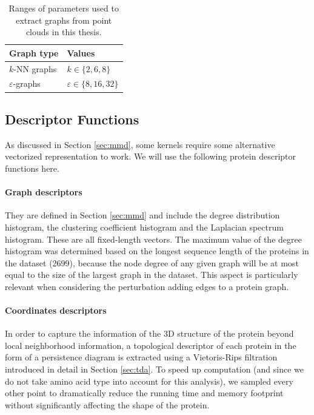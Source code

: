 \begin{table}
  \centering
  \begin{tabular}{ll}
    \toprule
    \textbf{Graph type} & \textbf{Values} \\
    \midrule
    $k$-NN graphs & $k\in \{2, 6, 8\}$ \\
    $\varepsilon$-graphs & $\varepsilon\in\{8, 16, 32\}$ \\
    \bottomrule
  \end{tabular}
  \caption{Ranges of parameters used to extract graphs from point clouds in this thesis.}
  \label{tab:graph_extraction}
\end{table}


\subsection{Descriptor Functions}\label{sec:descriptors}

As discussed in Section \ref{sec:mmd}, some kernels require some alternative vectorized
representation to work. We will use the following protein descriptor functions
here.


\paragraph{Graph descriptors} They are defined in Section \ref{sec:mmd} and include
  the degree distribution histogram, the clustering coefficient histogram and
  the Laplacian spectrum histogram. These are all fixed-length vectors. The
  maximum value of the degree histogram was determined based on the longest
  sequence length of the proteins in the dataset (2699), because the node degree
  of any given graph will be at most equal to the size of the largest graph in
  the dataset. This aspect is particularly relevant when considering the
  perturbation adding edges to a protein graph.

\paragraph{Coordinates descriptors} In order to capture the information of the
3D structure of the protein beyond local neighborhood information, a topological
descriptor of each protein in the form of a persistence diagram is extracted
using a Vietoris-Rips filtration introduced in detail in Section \ref{sec:tda}.
To speed up computation (and since we do not take amino acid type into account
for this analysis), we sampled every other point to dramatically reduce the
running time and memory footprint without significantly affecting the shape of
the protein.

